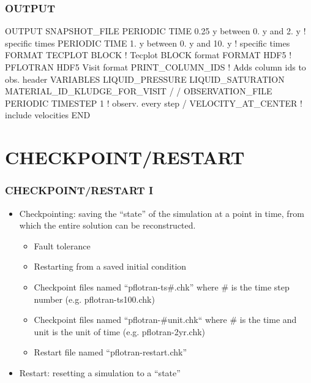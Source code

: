 \documentclass{beamer}
\newcommand\bluecomment[1]{{{\color{blue} #1}}}
\begin{document}
\begin{frame}[fragile]\frametitle{OUTPUT}

\begin{semiverbatim}\small

OUTPUT
  SNAPSHOT_FILE
    PERIODIC TIME 0.25 y between 0. y and 2. y \bluecomment{! specific times}
    PERIODIC TIME 1. y between 0. y and 10. y  \bluecomment{! specific times}
    FORMAT TECPLOT BLOCK  \bluecomment{! Tecplot BLOCK format}
    FORMAT HDF5           \bluecomment{! PFLOTRAN HDF5 Visit format}
    PRINT_COLUMN_IDS      \bluecomment{! Adds column ids to obs. header}
    VARIABLES
      LIQUID_PRESSURE
      LIQUID_SATURATION
      MATERIAL_ID_KLUDGE_FOR_VISIT
    /
  /
  OBSERVATION_FILE
    PERIODIC TIMESTEP 1  \bluecomment{! observ. every step}
  /
  VELOCITY_AT_CENTER     \bluecomment{! include velocities}
END

\end{semiverbatim}

\end{frame}

\section{CHECKPOINT/RESTART}

\begin{frame}[fragile]\frametitle{CHECKPOINT/RESTART I}

\begin{itemize}
\item Checkpointing: saving the ``state'' of the simulation at a point in time, from which the entire solution can be reconstructed.
  \begin{itemize}
    \item Fault tolerance
    \item Restarting from a saved initial condition
    \item Checkpoint files named ``pflotran-ts\#.chk'' where \# is the time step number (e.g. pflotran-ts100.chk)
    \item Checkpoint files named ``pflotran-\#unit.chk`` where \# is the time and unit is the unit of time (e.g. pflotran-2yr.chk)
    \item Restart file named ``pflotran-restart.chk''
  \end{itemize}
\item Restart: resetting a simulation to a ``state''
\end{itemize}

\end{frame}
\end{document}
